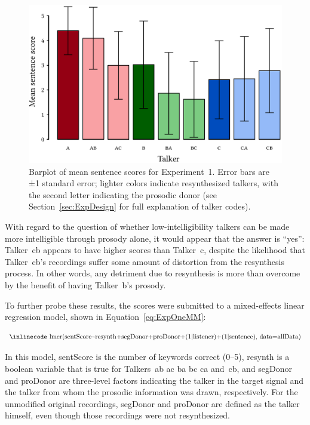 \begin{figure}[htbp]
	\begin{centering}
	\includegraphics{figures/results/ExpOneBarplot.eps}
	\caption[Barplot of mean sentence scores for Experiment~1]{Barplot of mean sentence scores for Experiment~1.  Error bars are ±1 standard error; lighter colors indicate resynthesized talkers, with the second letter indicating the prosodic donor (see Section~\ref{sec:ExpDesign} for full explanation of talker codes).\label{fig:ExpOneBarplot}}
	\end{centering}
\end{figure}

With regard to the question of whether low-intelligibility talkers can be made more intelligible through prosody alone, it would appear that the answer is “yes”: Talker~\ac{cb} appears to have higher scores than Talker~\ac{c}, despite the likelihood that Talker~\ac{cb}’s recordings suffer some amount of distortion from the resynthesis process.  In other words, any detriment due to resynthesis is more than overcome by the benefit of having Talker~\ac{b}’s prosody.  

To further probe these results, the scores were submitted to a mixed-effects linear regression model, shown in Equation~\ref{eq:ExpOneMM}:

\begin{equation}\label{eq:ExpOneMM}
	\text{{\inlinecode lmer(sentScore\textasciitilde resynth+segDonor+proDonor+(1|listener)+(1|sentence), data=allData)}}
\end{equation}

In this model, {\inlinecode sentScore} is the number of keywords correct (0–5), {\inlinecode resynth} is a boolean variable that is true for Talkers~\ac{ab ac ba bc ca} and~\ac{cb}, and {\inlinecode segDonor} and {\inlinecode proDonor} are three-level factors indicating the talker in the target signal and the talker from whom the prosodic information was drawn, respectively.  For the unmodified original recordings, {\inlinecode segDonor} and {\inlinecode proDonor} are defined as the talker himself, even though those recordings were not resynthesized.  

